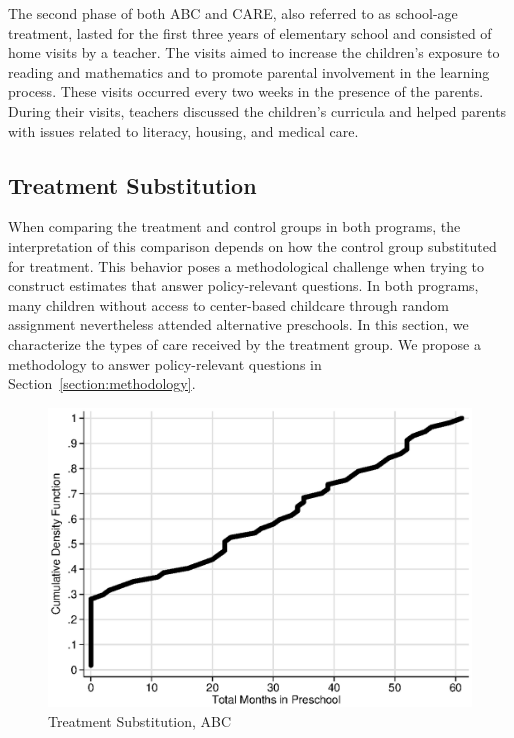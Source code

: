 \noindent The second phase of both ABC and CARE, also referred to as school-age treatment, lasted for the first three years of elementary school and consisted of home visits by a teacher. The visits aimed to increase the children's exposure to reading and mathematics and to promote parental involvement in the learning process. These visits occurred every two weeks in the presence of the parents. During their visits, teachers discussed the children's curricula and helped parents with issues related to literacy, housing, and medical care.\\

\subsection{Treatment Substitution}

\noindent When comparing the treatment and control groups in both programs, the interpretation of this comparison depends on how the control group substituted for treatment. This behavior poses a methodological challenge when trying to construct estimates that answer policy-relevant questions. In both programs, many children without access to center-based childcare through random assignment nevertheless attended alternative preschools. In this section, we characterize the types of care received by the treatment group. We propose a methodology to answer policy-relevant questions in Section~\ref{section:methodology}.\\

\begin{figure}[H]
		\caption{Treatment Substitution, ABC} \label{fig:treatsubabc}
		\includegraphics[width=.9\columnwidth]{output/abc_controlcontamination_months.eps}
\end{figure}

